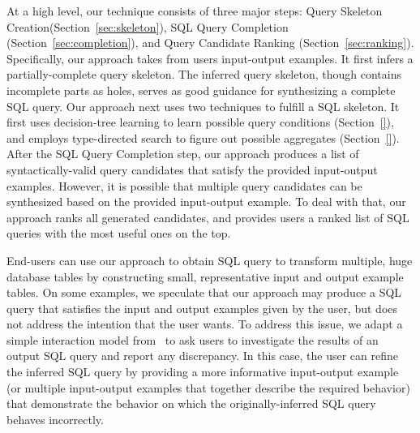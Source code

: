 At a high level, our technique consists of three major steps: Query Skeleton
Creation(Section~\ref{sec:skeleton}), SQL Query Completion
(Section~\ref{sec:completion}), and Query Candidate Ranking (Section~\ref{sec:ranking}).
Specifically, our approach takes from users input-output examples. It first infers
a partially-complete query skeleton. The inferred query skeleton, though contains
incomplete parts as holes, serves as good guidance for synthesizing a complete SQL query.
Our approach next uses two techniques to fulfill a SQL skeleton. It first
uses decision-tree learning to learn possible query conditions (Section~\ref{}), and
 employs type-directed search to figure out possible aggregates (Section~\ref{}).
After the SQL Query Completion step, our approach produces a list of syntactically-valid
query candidates that satisfy the provided input-output examples.
However, it is possible that multiple query candidates can be synthesized based on the
provided input-output example. To deal with that, our approach ranks all generated candidates,
and provides users a ranked list of SQL queries with the most useful ones on the top. 


End-users can use our approach to obtain SQL query to transform
multiple, huge database tables by constructing small, representative
input and output example tables. On some examples, we speculate
that our approach
may produce a SQL query that satisfies the input and output examples
given by the user, but does not address the intention
that the user wants. To address this issue, we adapt a simple
interaction model from~\cite{Harris:2011} to ask users to investigate the results of
an output SQL query and report any discrepancy. In this case,
the user can refine the inferred SQL query by providing a more
informative input-output example (or multiple input-output examples
that together describe the required behavior) that demonstrate the behavior on
which the originally-inferred SQL query behaves incorrectly.











